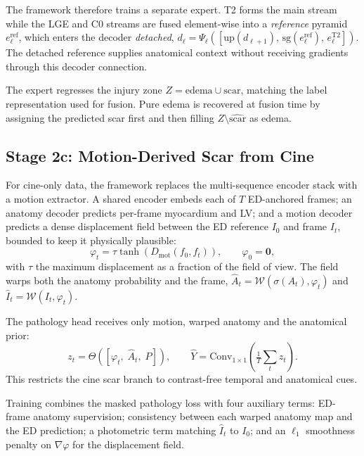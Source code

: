 \documentclass[runningheads]{llncs}
\newcommand{\TT}{\mathrm{T2}}
\newcommand{\sg}{\mathrm{sg}}
\newcommand{\warp}{\mathcal{W}}
\begin{document}
The framework therefore trains a separate expert. T2 forms the main stream while the
LGE and C0 streams are fused element-wise into a \emph{reference} pyramid
$e^{\text{ref}}_\ell$, which enters the decoder \emph{detached},
$d_\ell=\Psi_\ell([\mathrm{up}(d_{\ell+1}),\,\sg(e^{\text{ref}}_\ell),\,e^{\TT}_\ell])$.
The detached reference supplies anatomical context without receiving gradients
through this decoder connection.

The expert regresses the injury zone $Z=\text{edema}\cup\text{scar}$, matching
the label representation used for fusion. Pure edema is recovered at fusion time
by assigning the predicted scar first and then filling
$Z\setminus\widehat{\text{scar}}$ as edema.

\subsection{Stage 2c: Motion-Derived Scar from Cine}

For cine-only data, the framework replaces the multi-sequence encoder stack with a
motion extractor. A shared encoder embeds each of $T$ ED-anchored frames; an
anatomy decoder predicts per-frame myocardium and LV; and a motion decoder
predicts a dense displacement field between the ED reference $I_0$ and frame
$I_t$, bounded to keep it physically plausible:
\begin{equation}
\varphi_t=\tau\tanh\!\left(D_{\text{mot}}(f_0,f_t)\right),\qquad \varphi_0=\mathbf{0},
\end{equation}
with $\tau$ the maximum displacement as a fraction of the field of view. The
field warps both the anatomy probability and the frame,
$\hat{A}_t=\warp(\sigma(A_t),\varphi_t)$ and $\hat{I}_t=\warp(I_t,\varphi_t)$.

The pathology head receives only motion, warped anatomy and the anatomical prior:
\begin{equation}
z_t=\Theta\!\left(\left[\varphi_t,\;\hat{A}_t,\;P\right]\right),
\qquad
\hat{Y}=\mathrm{Conv}_{1\times1}\!\left(\tfrac{1}{T}\textstyle\sum_{t} z_t\right).
\label{eq:cinehead}
\end{equation}
This restricts the cine scar branch to contrast-free temporal and anatomical
cues.

Training combines the masked pathology loss with four auxiliary terms: ED-frame
anatomy supervision; consistency between each warped anatomy map and the ED
prediction; a photometric term matching $\hat{I}_t$ to $I_0$; and an $\ell_1$
smoothness penalty on $\nabla\varphi$ for the displacement field.
\end{document}
